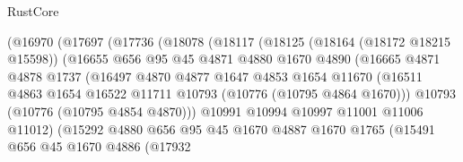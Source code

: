 \begin{lexlean}{RustCore}
\begin{coremodule}
                        (@16970
                          (@17697
                            (@17736
                              (@18078
                                (@18117
                                  (@18125
                                    (@18164 (@18172 @18215 @15598))
                                    (@16655
                                      @656
                                      @95
                                      @45
                                      @4871
                                      @4880
                                      @1670
                                      @4890
                                      (@16665
                                        @4871
                                        @4878
                                        @1737
                                        (@16497
                                          @4870
                                          @4877
                                          @1647
                                          @4853
                                          @1654
                                          @11670
                                          (@16511
                                            @4863
                                            @1654
                                            @16522
                                            @11711
                                            @10793
                                            (@10776 (@10795 @4864 @1670)))
                                          @10793
                                          (@10776 (@10795 @4854 @4870)))
                                        @10991
                                        @10994
                                        @10997
                                        @11001
                                        @11006
                                        @11012)
                                      (@15292
                                        @4880
                                        @656
                                        @95
                                        @45
                                        @1670
                                        @4887
                                        @1670
                                        @1765
                                        (@15491
                                          @656
                                          @45
                                          @1670
                                          @4886
                                          (@17932

\end{coremodule}
\end{lexlean}
